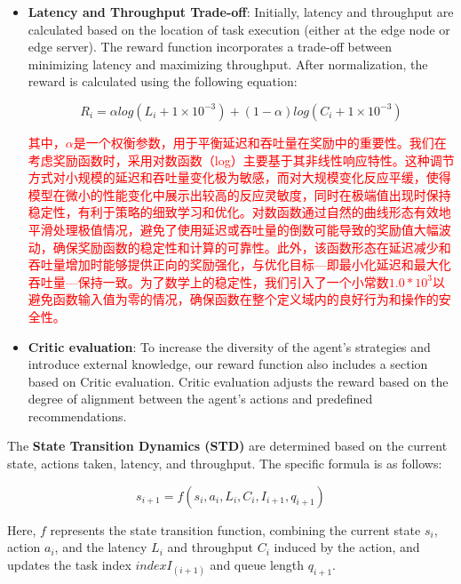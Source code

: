 \documentclass[preprint,12pt]{elsarticle}
\begin{document}
\begin{itemize}

    \item {\fontsize{11}{\baselineskip}\selectfont \textbf{Latency and Throughput Trade-off}}: Initially, latency and throughput are calculated based on the location of task execution (either at the edge node or edge server). The reward function incorporates a trade-off between minimizing latency and maximizing throughput. After normalization, the reward is calculated using the following equation:

        \begin{equation}
            R_i=\alpha log(L_i+1\times 10^{-3})+(1-\alpha)log(C_i+1\times 10^{-3})
        \end{equation}

    \textcolor{red}{其中，\(\alpha\)是一个权衡参数，用于平衡延迟和吞吐量在奖励中的重要性。我们在考虑奖励函数时，采用对数函数（log）主要基于其非线性响应特性。这种调节方式对小规模的延迟和吞吐量变化极为敏感，而对大规模变化反应平缓，使得模型在微小的性能变化中展示出较高的反应灵敏度，同时在极端值出现时保持稳定性，有利于策略的细致学习和优化。对数函数通过自然的曲线形态有效地平滑处理极值情况，避免了使用延迟或吞吐量的倒数可能导致的奖励值大幅波动，确保奖励函数的稳定性和计算的可靠性。此外，该函数形态在延迟减少和吞吐量增加时能够提供正向的奖励强化，与优化目标—即最小化延迟和最大化吞吐量—保持一致。为了数学上的稳定性，我们引入了一个小常数\(1.0*10^3\)以避免函数输入值为零的情况，确保函数在整个定义域内的良好行为和操作的安全性。}

    \item {\fontsize{11}{\baselineskip}\selectfont \textbf{Critic evaluation}}: To increase the diversity of the agent's strategies and introduce external knowledge, our reward function also includes a section based on Critic evaluation. Critic evaluation adjusts the reward based on the degree of alignment between the agent's actions and predefined recommendations.
    

\end{itemize}

The \textbf{State Transition Dynamics (STD)}  are determined based on the current state, actions taken, latency, and throughput. The specific formula is as follows:

\begin{equation}
        s_{i+1}=f(s_i,a_i,L_i,C_i,I_{i+1},q_{i+1})
    \end{equation}

Here, \(f\) represents the state transition function, combining the current state \(s_i\), action \(a_i\), and the latency \(L_i\) and throughput \(C_i\) induced by the action, and updates the task index \(indexI_(i+1)\) and queue length \(q_{i+1}\).
\end{document}

